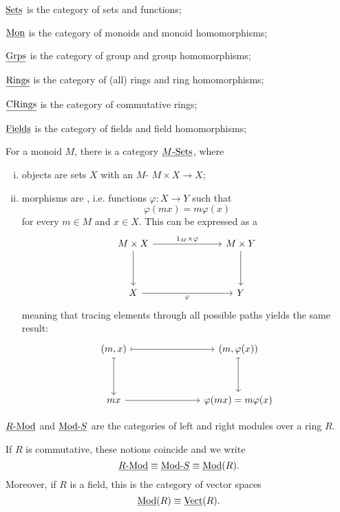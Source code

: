 \begin{examples*}
	\item \( \ctSet \) is the category of sets and functions;
	\item \( \ctMon \) is the category of monoids and monoid homomorphisms;
	\item \( \ctGrp \) is the category of group and group homomorphisms;
	\item \( \ctRing \) is the category of (all) rings and ring homomorphisms;
	\item \( \ctCRing \) is the category of commutative rings;
	\item \( \ctField \) is the category of fields and field homomorphisms;
	\item For a monoid \( M \), there is a category \( \ctGSet[M] \), where
		\begin{enumerate}[(i)]
			\item objects are sets \( X \) with an \( M \)- \( M \times X \to X \);
			\item morphisms are , i.e. functions \( \varphi: X \to Y \) such that
				\[
					\varphi(mx) = m \varphi(x)
				\]
				for every \( m \in M \) and \( x \in X \). This can be expressed as a 
				\[
					\begin{tikzcd}{M \times X} &&& {M \times Y} \\
						\\
						X &&& Y
						\arrow["{1_M \times \varphi}", from=1-1, to=1-4]
						\arrow[from=1-1, to=3-1]
						\arrow[from=1-4, to=3-4]
						\arrow["\varphi"', from=3-1, to=3-4]
					\end{tikzcd}
				\]
				meaning that tracing elements through all possible paths yields the same result:
				\[
					\begin{tikzcd}{(m, x)} &&& {(m, \varphi(x))} \\
						\\
						mx &&& {\varphi(mx) = m \varphi(x)}
						\arrow[maps to, from=1-1, to=1-4]
						\arrow[maps to, from=1-1, to=3-1]
						\arrow[maps to, from=1-4, to=3-4]
						\arrow[from=3-1, to=3-4]
					\end{tikzcd}
				\]
		\end{enumerate}

	\item \( \ctRMod \) and \( \ctModR \) are the categories of left and right modules over a ring \( R \).

		If \( R \) is commutative, these notions coincide and we write
		\[
			\ctRMod \equiv \ctModR \equiv \ctMod(R).
		\]
		Moreover, if \( R \) is a field, this is the category of vector spaces
		\[
			\ctMod(R) \equiv \ctVect(R).
		\]


\end{examples*}
